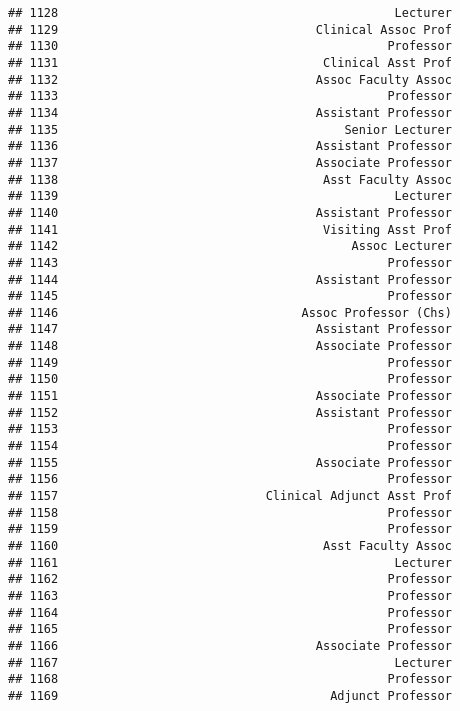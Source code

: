 \documentclass[
]{article}
\begin{document}
\begin{verbatim}
## 1128                                               Lecturer
## 1129                                    Clinical Assoc Prof
## 1130                                              Professor
## 1131                                     Clinical Asst Prof
## 1132                                    Assoc Faculty Assoc
## 1133                                              Professor
## 1134                                    Assistant Professor
## 1135                                        Senior Lecturer
## 1136                                    Assistant Professor
## 1137                                    Associate Professor
## 1138                                     Asst Faculty Assoc
## 1139                                               Lecturer
## 1140                                    Assistant Professor
## 1141                                     Visiting Asst Prof
## 1142                                         Assoc Lecturer
## 1143                                              Professor
## 1144                                    Assistant Professor
## 1145                                              Professor
## 1146                                  Assoc Professor (Chs)
## 1147                                    Assistant Professor
## 1148                                    Associate Professor
## 1149                                              Professor
## 1150                                              Professor
## 1151                                    Associate Professor
## 1152                                    Assistant Professor
## 1153                                              Professor
## 1154                                              Professor
## 1155                                    Associate Professor
## 1156                                              Professor
## 1157                             Clinical Adjunct Asst Prof
## 1158                                              Professor
## 1159                                              Professor
## 1160                                     Asst Faculty Assoc
## 1161                                               Lecturer
## 1162                                              Professor
## 1163                                              Professor
## 1164                                              Professor
## 1165                                              Professor
## 1166                                    Associate Professor
## 1167                                               Lecturer
## 1168                                              Professor
## 1169                                      Adjunct Professor

\end{verbatim}
\end{document}
